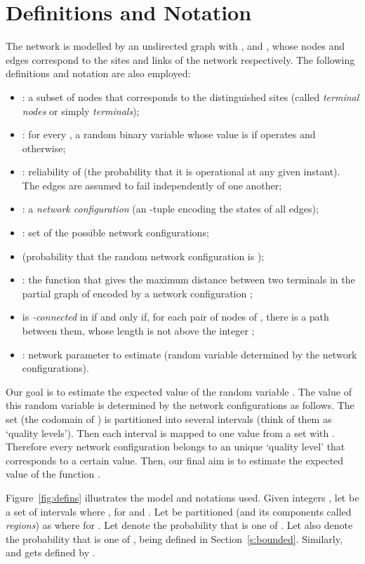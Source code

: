 \documentclass[a4paper]{article}
\begin{document}
\section{Definitions and Notation}\label{s:defin}

The network is modelled by an undirected graph  with ,  and , whose nodes and edges correspond to the sites and links of the network respectively. The following definitions and notation are also employed:

\begin{itemize}
\item : a subset of nodes that corresponds to the distinguished sites (called \emph{terminal nodes} or simply \emph{terminals});
\item : for every , a random binary variable whose value is  if  operates and  otherwise;
\item : reliability of  (the probability that it is operational at any given instant). The edges are assumed to fail independently of one another;
\item : a \emph{network configuration} (an -tuple encoding the states of all edges);
\item : set of the  possible network configurations;
\item  (probability that the random network configuration is );
\item : the function that gives the maximum distance  between two terminals in the partial graph of  encoded by a network configuration ;
\item  is \emph{-connected} in  if and only if, for each pair of nodes of , there is a path between them, whose length is not above the integer ;
\item : network parameter to estimate (random variable determined by the network configurations).
\end{itemize}

Our goal is to estimate the expected value of the random variable . The value of this random variable is determined by the network configurations as follows. The set  (the codomain of ) is partitioned into several intervals (think of them as `quality levels'). Then each interval is mapped to one value from a set  with . Therefore every network configuration  belongs to an unique `quality level' that corresponds to a certain  value. Then, our final aim is to estimate the expected value of the function .

Figure~\ref{fig:defins} illustrates the model and notations used. Given  integers , let  be a set of intervals where ,  for  and . Let  be partitioned (and its components called \emph{regions}) as  where  for . Let  denote the probability that  is one of . Let also  denote the probability that  is one of , being  defined in Section~\ref{s:bounded}. Similarly,  and  gets defined by . 
\end{document}
